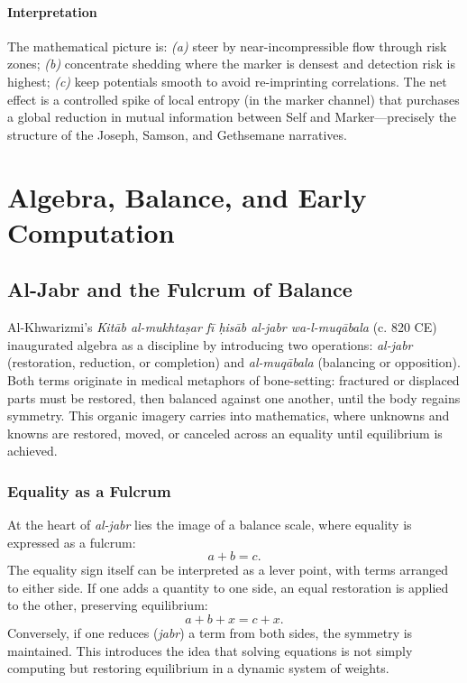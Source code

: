 \documentclass[a4paper,11pt,openany]{book}
\begin{document}
\subsection{Interpretation}
The mathematical picture is: \emph{(a)} steer by near-incompressible flow through risk zones; \emph{(b)} concentrate shedding where the marker is densest and detection risk is highest; \emph{(c)} keep potentials smooth to avoid re-imprinting correlations. The net effect is a controlled spike of local entropy (in the marker channel) that purchases a global reduction in mutual information between Self and Marker—precisely the structure of the Joseph, Samson, and Gethsemane narratives.

\part{Algebra, Balance, and Early Computation}

\chapter{Al-Jabr and the Fulcrum of Balance}

Al-Khwarizmi’s \emph{Kitāb al-mukhtaṣar fī ḥisāb al-jabr wa-l-muqābala} (c. 820 CE) \citep{rashed2009algebra} inaugurated algebra as a discipline by introducing two operations: 
\emph{al-jabr} (restoration, reduction, or completion) and \emph{al-muqābala} (balancing or opposition). 
Both terms originate in medical metaphors of bone-setting: fractured or displaced parts must be restored, then balanced against one another, until the body regains symmetry. 
This organic imagery carries into mathematics, where unknowns and knowns are restored, moved, or canceled across an equality until equilibrium is achieved.

\section{Equality as a Fulcrum}
At the heart of \emph{al-jabr} lies the image of a balance scale, where equality is expressed as a fulcrum:
\[
a + b = c.
\]
The equality sign itself can be interpreted as a lever point, with terms arranged to either side. 
If one adds a quantity to one side, an equal restoration is applied to the other, preserving equilibrium:
\[
a + b + x = c + x.
\]
Conversely, if one reduces (\emph{jabr}) a term from both sides, the symmetry is maintained. 
This introduces the idea that solving equations is not simply computing but restoring equilibrium in a dynamic system of weights.
\end{document}
